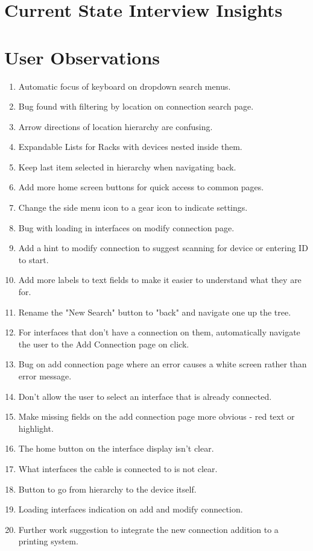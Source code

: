 \documentclass [11pt,a4paper]{article}
\begin{document}
\section{Current State Interview Insights}
\label{sec:current_state_interview_takeaways}


\section{User Observations }
\label{sec:appendix_observations}
\begin{enumerate}
    \item Automatic focus of keyboard on dropdown search menus.
    \item Bug found with filtering by location on connection search page.
    \item Arrow directions of location hierarchy are confusing.
    \item Expandable Lists for Racks with devices nested inside them.
    \item Keep last item selected in hierarchy when navigating back.
    \item Add more home screen buttons for quick access to common pages.
    \item Change the side menu icon to a gear icon to indicate settings.
    \item Bug with loading in interfaces on modify connection page.
    \item Add a hint to modify connection to suggest scanning for device or entering ID to start.
    \item Add more labels to text fields to make it easier to understand what they are for.
    \item Rename the "New Search" button to "back" and navigate one up the tree. 
    \item For interfaces that don't have a connection on them, automatically navigate the user to the Add Connection page on click.
    \item Bug on add connection page where an error causes a white screen rather than error message.
    \item Don't allow the user to select an interface that is already connected.
    \item Make missing fields on the add connection page more obvious - red text or highlight.
    \item The home button on the interface display isn't clear. 
    \item What interfaces the cable is connected to is not clear.
    \item Button to go from hierarchy to the device itself. 
    \item Loading interfaces indication on add and modify connection.
    \item Further work suggestion to integrate the new connection addition to a printing system.
\end{enumerate}


\end{document}
